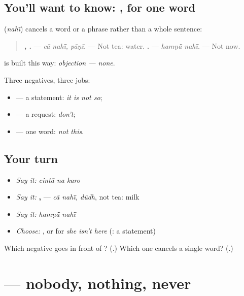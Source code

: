 \subsection*{You'll want to know: , for one word}
\textbf{} (\emph{nahī̃}) cancels a word or a phrase rather than a whole sentence:

\begin{quote}
\textbf{ , .} — \emph{cā nahī̃, pāṇī.} — Not tea: water. \textbf{ .} — \emph{hamṇā̃ nahī̃.} — Not now.
\end{quote}

\textbf{ } is built this way: \emph{objection — none}.

Three negatives, three jobs:

\begin{itemize}
\raggedright
  \item \textbf{} — a statement: \emph{it is not so};
  \item \textbf{} — a request: \emph{don't};
  \item \textbf{} — one word: \emph{not this}.
\end{itemize}

\subsection*{Your turn}
\begin{itemize}
\raggedright
  \item \emph{Say it:} \emph{cintā na karo}
  \item \emph{Say it:} \textbf{ , } — \emph{cā nahī̃, dūdh}, not tea: milk
  \item \emph{Say it:} \emph{hamṇā̃ nahī̃}
  \item \emph{Choose:} \textbf{}, \textbf{} or \textbf{} for \emph{she isn't here} (\textbf{}: a statement)
\end{itemize}

\begin{tcolorbox}[breakable,colback=teal!4,colframe=teal!35!black,title={Before you move on}]
Which negative goes in front of \textbf{}? (\textbf{}.) Which one cancels a single word? (\textbf{}.)
\end{tcolorbox}
\section[\texorpdfstring{\gu{કોઈ} … \gu{નથી} (koī … nathī)}{કોઈ … નથી (koī … nathī)}]{  — nobody, nothing, never}

